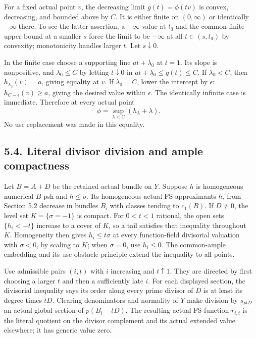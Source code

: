 \documentclass[
  10pt,
]{article}
\begin{document}
For a fixed actual point \(v\), the decreasing limit \(g(t)=\phi(tv)\)
is convex, decreasing, and bounded above by \(C\). It is either finite
on \((0,\infty)\) or identically \(-\infty\) there. To see the latter
assertion, a \(-\infty\) value at \(t_0\) and the common finite upper
bound at a smaller \(s\) force the limit to be \(-\infty\) at all
\(t\in(s,t_0)\) by convexity; monotonicity handles larger \(t\). Let
\(s\downarrow0\).

In the finite case choose a supporting line \(at+\lambda_0\) at \(t=1\).
Its slope is nonpositive, and \(\lambda_0\leq C\) by letting
\(t\downarrow0\) in \(at+\lambda_0\leq g(t)\leq C\). If \(\lambda_0<C\),
then \(h_{\lambda_0}(v)=a\), giving equality at \(v\). If
\(\lambda_0=C\), lower the intercept by \(\epsilon\):
\(h_{C-\epsilon}(v)\geq a\), giving the desired value within
\(\epsilon\). The identically infinite case is immediate. Therefore at
every actual point
\[\phi=\sup_{\lambda<C}(h_\lambda+\lambda).                \tag{5.2}\]
No usc replacement was made in this equality.

\subsection{5.4. Literal divisor division and ample
compactness}\label{literal-divisor-division-and-ample-compactness}

Let \(B=A+D\) be the retained actual bundle on \(Y\). Suppose \(h\) is
homogeneous numerical \(B\)-psh and \(h\leq\sigma\). Its homogeneous
actual FS approximants \(h_i\) from Section 5.2 decrease in bundles
\(B_i\) with classes tending to \(c_1(B)\). If \(D\ne0\), the level set
\(K=\{\sigma=-1\}\) is compact. For \(0<t<1\) rational, the open sets
\(\{h_i<-t\}\) increase to a cover of \(K\), so a tail satisfies that
inequality throughout \(K\). Homogeneity then gives \(h_i\leq t\sigma\)
at every function-field divisorial valuation with \(\sigma<0\), by
scaling to \(K\); when \(\sigma=0\), use \(h_i\leq0\). The common-ample
embedding and its usc-obstacle principle extend the inequality to all
points.

Use admissible pairs \((i,t)\) with \(i\) increasing and \(t\uparrow1\).
They are directed by first choosing a larger \(t\) and then a
sufficiently late \(i\). For each displayed section, the divisorial
inequality says its order along every prime divisor of \(D\) is at least
its degree times \(tD\). Clearing denominators and normality of \(Y\)
make division by \(s_{ptD}\) an actual global section of \(p(B_i-tD)\).
The resulting actual FS function \(r_{i,t}\) is the literal quotient on
the divisor complement and its actual extended value elsewhere; it has
generic value zero.
\end{document}
